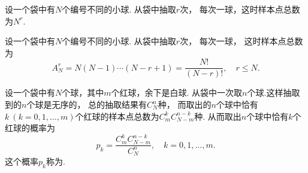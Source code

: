 \begin{example}
设一个袋中有\(N\)个编号不同的小球.
从袋中抽取\(r\)次，
每次一球，这时样本点总数为\(N^r\).
\end{example}

\begin{example}
设一个袋中有\(N\)个编号不同的小球.
从袋中抽取\(r\)次，
每次一球，
这时样本点总数为\[
	A_N^r = N(N-1)\dotsb(N-r+1) = \frac{N!}{(N-r)!},
	\quad
	r \leq N.
\]
\end{example}

\begin{example}
设一个袋中有\(N\)个球，其中\(m\)个红球，余下是白球.
从袋中一次取\(n\)个球.这样抽取到的\(n\)个球是无序的，
总的抽取结果有\(C_N^n\)种，
而取出的\(n\)个球中恰有\(k\ (k=0,1,\dotsc,m)\)个红球的样本点总数为\(C_m^k C_{N-m}^{n-k}\)种.
从而取出\(n\)个球中恰有\(k\)个红球的概率为\[
	p_k = \frac{C_m^k C_{N-m}^{n-k}}{C_N^n},
	\quad k=0,1,\dotsc,m.
\]
这个概率\(p_k\)称为.
\end{example}

